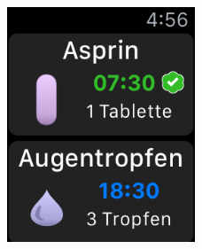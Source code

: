 \begin{figure}
	\includegraphics[width=0.5\textwidth]{04_realisation/screenshots/watch/taken02.png}
\end{figure}

